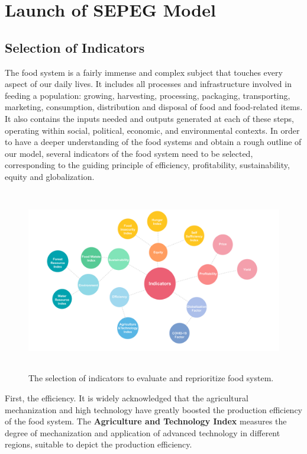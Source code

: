 \documentclass{mcmthesis}
\begin{document}
 \section{Launch of SEPEG Model}
 \subsection{Selection of Indicators}\label{subsec-indicators}
 The food system is a fairly immense and complex subject that touches every aspect of our daily lives. It includes all processes and infrastructure involved in feeding a population: growing, harvesting, processing, packaging, transporting, marketing, consumption, distribution and disposal of food and food-related items. It also contains the inputs needed and outputs generated at each of these steps, operating within social, political, economic, and environmental contexts\cite{Wiki_foodsystem}. In order to have a deeper understanding of the food systems and obtain a rough outline of our model, several indicators of the food system need to be selected, corresponding to the guiding principle of efficiency, profitability, sustainability, equity and globalization. 
 
 \begin{figure}[H]
	\centering
	\includegraphics[height=8cm]{Indicators.pdf} 
	\caption{The selection of indicators to evaluate and reprioritize food system.}
	\label{fig:indicators}
\end{figure}
 
 First, the efficiency. It is widely acknowledged that the agricultural mechanization and high technology have greatly boosted the production efficiency of the food system. The \textbf{Agriculture and Technology Index} measures the degree of mechanization and application of advanced technology in different regions, suitable to depict the production efficiency.
 
\end{document}
